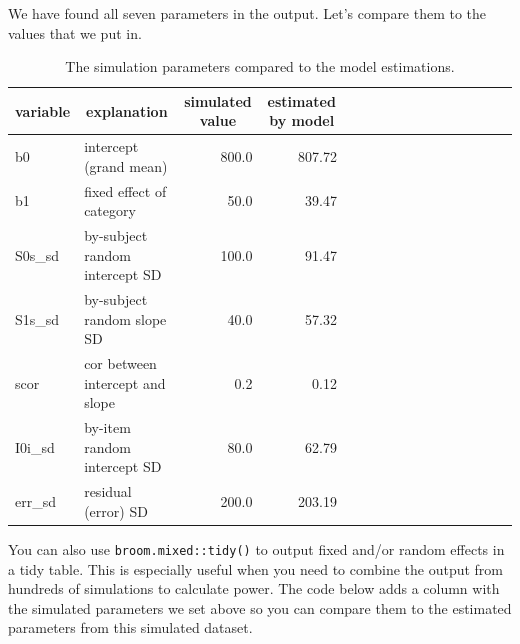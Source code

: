\documentclass[doc,floatsintext]{apa6}
\newenvironment{Shaded}{\begin{snugshade}}{\end{snugshade}}
\newcommand{\KeywordTok}[1]{\textcolor[rgb]{0.13,0.29,0.53}{\textbf{#1}}}
\newcommand{\DataTypeTok}[1]{\textcolor[rgb]{0.13,0.29,0.53}{#1}}
\newcommand{\DecValTok}[1]{\textcolor[rgb]{0.00,0.00,0.81}{#1}}
\newcommand{\StringTok}[1]{\textcolor[rgb]{0.31,0.60,0.02}{#1}}
\newcommand{\CommentTok}[1]{\textcolor[rgb]{0.56,0.35,0.01}{\textit{#1}}}
\newcommand{\OperatorTok}[1]{\textcolor[rgb]{0.81,0.36,0.00}{\textbf{#1}}}
\newcommand{\NormalTok}[1]{#1}
\begin{document}
We have found all seven parameters in the output. Let's compare them to
the values that we put in.

\begin{table}[H]
\begin{center}
\begin{threeparttable}
\caption{\label{tab:param-compare}The simulation parameters compared to the model estimations.}
\begin{tabular}{llrrllrrllrrllrr}
\toprule
variable & \multicolumn{1}{c}{explanation} & \multicolumn{1}{c}{simulated value} & \multicolumn{1}{c}{estimated by model}\\
\midrule
b0 & intercept (grand mean) & 800.0 & 807.72\\
b1 & fixed effect of category & 50.0 & 39.47\\
S0s\_sd & by-subject random intercept SD & 100.0 & 91.47\\
S1s\_sd & by-subject random slope SD & 40.0 & 57.32\\
scor & cor between intercept and slope & 0.2 & 0.12\\
I0i\_sd & by-item random intercept SD & 80.0 & 62.79\\
err\_sd & residual (error) SD & 200.0 & 203.19\\
\bottomrule
\end{tabular}
\end{threeparttable}
\end{center}
\end{table}

You can also use \texttt{broom.mixed::tidy()} to output fixed and/or
random effects in a tidy table. This is especially useful when you need
to combine the output from hundreds of simulations to calculate power.
The code below adds a column with the simulated parameters we set above
so you can compare them to the estimated parameters from this simulated
dataset.

\begin{Shaded}
\end{Shaded}
\end{document}
